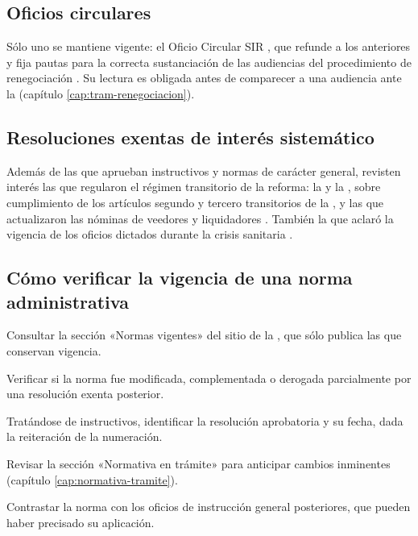 \subsection{Oficios circulares}

Sólo uno se mantiene vigente: el Oficio Circular SIR , que refunde a los
anteriores y fija pautas para la correcta sustanciación de las audiencias del
procedimiento de renegociación \parencite{oficio-circular-5}. Su lectura es obligada
antes de comparecer a una audiencia ante la \superir{} (capítulo
\ref{cap:tram-renegociacion}).

\subsection{Resoluciones exentas de interés sistemático}

Además de las que aprueban instructivos y normas de carácter general, revisten interés
las que regularon el régimen transitorio de la reforma: la  y la
, sobre cumplimiento de los artículos segundo y tercero transitorios
de la \Lreforma{} \parencite{resex-6643, resex-6644}, y las que actualizaron las nóminas
de veedores y liquidadores \parencite{resex-6638, resex-6640}. También la que aclaró la
vigencia de los oficios dictados durante la crisis sanitaria \parencite{resex-7101}.

\bloquePractico

\subsection{Cómo verificar la vigencia de una norma administrativa}

\begin{checklist}
  \item Consultar la sección «Normas vigentes» del sitio de la \superir{}, que sólo
  publica las que conservan vigencia.
  \item Verificar si la norma fue modificada, complementada o derogada parcialmente por
  una resolución exenta posterior.
  \item Tratándose de instructivos, identificar la resolución aprobatoria y su fecha,
  dada la reiteración de la numeración.
  \item Revisar la sección «Normativa en trámite» para anticipar cambios inminentes
  (capítulo \ref{cap:normativa-tramite}).
  \item Contrastar la norma con los oficios de instrucción general posteriores, que
  pueden haber precisado su aplicación.
\end{checklist}

